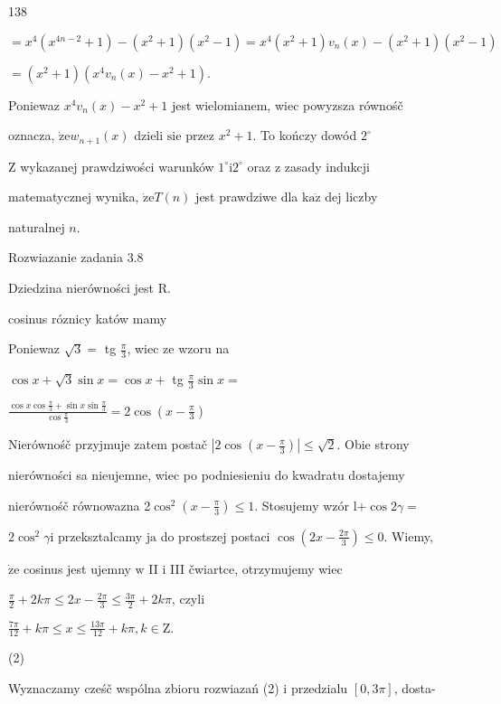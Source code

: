 \documentclass[a4paper,12pt]{article}
\begin{document}
138

$=x^{4}(x^{4n-2}+1)-(x^{2}+1)(x^{2}-1)=x^{4}(x^{2}+1)v_{n}(x)-(x^{2}+1)(x^{2}-1)$

$=(x^{2}+1)(x^{4}v_{n}(x)-x^{2}+1).$

Poniewaz $x^{4}v_{n}(x)-x^{2}+1$ jest wielomianem, wiec powyzsza równośč

oznacza, $\dot{\mathrm{z}}\mathrm{e}w_{n+1}(x)$ dzieli $\mathrm{s}\mathrm{i}\mathrm{e}$ przez $x^{2}+1$. To kończy dowód $2^{\circ}$

$\mathrm{Z}$ wykazanej prawdziwości warunków $1^{\circ} \mathrm{i} 2^{\circ}$ oraz $\mathrm{z}$ zasady indukcji

matematycznej wynika, $\dot{\mathrm{z}}\mathrm{e} T(n)$ jest prawdziwe dla $\mathrm{k}\mathrm{a}\dot{\mathrm{z}}$ dej liczby

naturalnej $n.$

Rozwiazanie zadania 3.8

Dziedzina nierówności jest R.

cosinus róznicy katów mamy

Poniewaz $\sqrt{3}=$ tg $\displaystyle \frac{\pi}{3}$, wiec ze wzoru na

$\cos x+\sqrt{3}\sin x=\cos x +$ tg $\displaystyle \frac{\pi}{3}\sin x=$

$\displaystyle \frac{\cos x\cos\frac{\pi}{3}+\sin x\sin\frac{\pi}{3}}{\cos\frac{\pi}{3}}=2\cos(x-\frac{\pi}{3})$

Nierównośč przyjmuje zatem postač $|2\displaystyle \cos(x-\frac{\pi}{3})| \leq \sqrt{2}$. Obie strony

nierówności sa nieujemne, wiec po podniesieniu do kwadratu dostajemy

nierównośč równowazna 2$\displaystyle \cos^{2}(x-\frac{\pi}{3}) \leq 1$. Stosujemy wzór l$+ \cos 2\gamma=$

$2\cos^{2}\gamma \mathrm{i}$ przeksztalcamy $\mathrm{j}\mathrm{a}$ do prostszej postaci $\displaystyle \cos(2x-\frac{2\pi}{3}) \leq 0$. Wiemy,

$\dot{\mathrm{z}}\mathrm{e}$ cosinus jest ujemny $\mathrm{w}$ II $\mathrm{i}$ III čwiartce, otrzymujemy wiec

$\displaystyle \frac{\pi}{2}+2k\pi\leq 2x-\frac{2\pi}{3}\leq\frac{3\pi}{2}+2k\pi$, czyli

$\displaystyle \frac{7\pi}{12}+k\pi\leq x\leq\frac{13\pi}{12}+k\pi, k\in \mathrm{Z}.$

(2)

Wyznaczamy cześč wspólna zbioru rozwiazań (2) $\mathrm{i}$ przedzialu $[0,3\pi]$, dosta-
\end{document}
